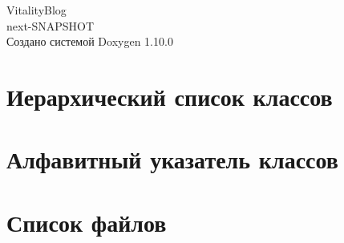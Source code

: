 \documentclass[twoside]{book}
\newcommand{\+}{\discretionary{\mbox{\scriptsize$\hookleftarrow$}}{}{}}
\newcommand{\clearemptydoublepage}{%
    \newpage{\pagestyle{empty}\cleardoublepage}%
  }
\begin{document}
  \raggedbottom
    \hypersetup{pageanchor=false,
                bookmarksnumbered=true,
                pdfencoding=unicode
               }
  \begin{titlepage}
  \vspace*{7cm}
  \begin{center}%
  {\Large Vitality\+Blog}\\
  [1ex]\large next-\/\+SNAPSHOT \\
  \vspace*{1cm}
  {\large Создано системой Doxygen 1.10.0}\\
  \end{center}
  \end{titlepage}
  \clearemptydoublepage
  \tableofcontents
  \clearemptydoublepage
  \hypersetup{pageanchor=true}
\chapter{Иерархический список классов}

\chapter{Алфавитный указатель классов}

\chapter{Список файлов}

\end{document}
